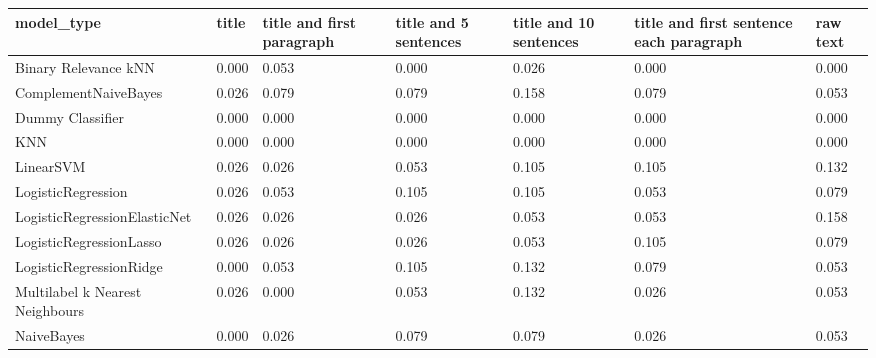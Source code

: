 \begin{tabular}{lllllll}
\toprule
                     model\_type & title & title and first paragraph & title and 5 sentences & title and 10 sentences & title and first sentence each paragraph & raw text \\
\midrule
           Binary Relevance kNN & 0.000 &                     0.053 &                 0.000 &                  0.026 &                                   0.000 &    0.000 \\
           ComplementNaiveBayes & 0.026 &                     0.079 &                 0.079 &                  0.158 &                                   0.079 &    0.053 \\
               Dummy Classifier & 0.000 &                     0.000 &                 0.000 &                  0.000 &                                   0.000 &    0.000 \\
                            KNN & 0.000 &                     0.000 &                 0.000 &                  0.000 &                                   0.000 &    0.000 \\
                      LinearSVM & 0.026 &                     0.026 &                 0.053 &                  0.105 &                                   0.105 &    0.132 \\
             LogisticRegression & 0.026 &                     0.053 &                 0.105 &                  0.105 &                                   0.053 &    0.079 \\
   LogisticRegressionElasticNet & 0.026 &                     0.026 &                 0.026 &                  0.053 &                                   0.053 &    0.158 \\
        LogisticRegressionLasso & 0.026 &                     0.026 &                 0.026 &                  0.053 &                                   0.105 &    0.079 \\
        LogisticRegressionRidge & 0.000 &                     0.053 &                 0.105 &                  0.132 &                                   0.079 &    0.053 \\
Multilabel k Nearest Neighbours & 0.026 &                     0.000 &                 0.053 &                  0.132 &                                   0.026 &    0.053 \\
                     NaiveBayes & 0.000 &                     0.026 &                 0.079 &                  0.079 &                                   0.026 &    0.053 \\

\end{tabular}
